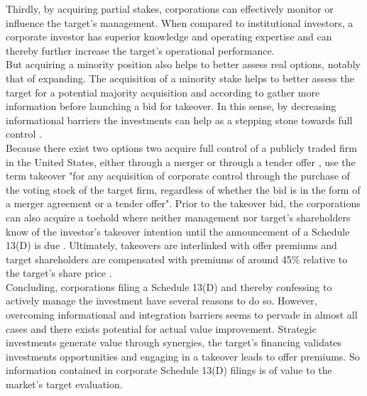 \documentclass[12pt]{article}
\begin{document}
Thirdly, by acquiring partial stakes, corporations can effectively monitor or influence the target's management. When compared to institutional investors, a corporate investor has superior knowledge and operating expertise \citep[p.2792]{Allen2000} and can thereby further increase the target's operational performance.\\
But acquiring a minority position also helps to better assess real options, notably that of expanding. The acquisition of a minority stake helps to better assess the target for a potential majority acquisition \citep{Ouimet2013} and according to \citet[p.30]{Huang2017} gather more information before launching a bid for takeover. In this sense, by decreasing informational barriers the investments can help as a stepping stone towards full control \citep[p.3]{Huang2017}.\\
Because there exist two options two acquire full control of a publicly traded firm in the United States, either through a merger or through a tender offer \citep[p.2]{Offenberg2015}, \citet[p.1]{Betton2008} use the term takeover "for any acquisition of corporate control through the purchase of the voting stock of the target firm, regardless of whether the bid is in the form of a merger agreement or a tender offer".
Prior to the takeover bid, the corporations can also acquire a toehold where neither management nor target's shareholders know of the investor's takeover intention until the announcement of a Schedule 13(D) is due \citep[p.158]{Eckbo2009}. Ultimately, takeovers are interlinked with offer premiums and target shareholders are compensated with premiums of around 45\% relative to the target's share price \citep[p.154]{Eckbo2009}.\\
Concluding, corporations filing a Schedule 13(D) and thereby confessing to actively manage the investment have several reasons to do so. However, overcoming informational and integration barriers seems to pervade in almost all cases and there exists potential for actual value improvement. Strategic investments generate value through synergies, the target's financing validates investments opportunities and engaging in a takeover leads to offer premiums. So information contained in corporate Schedule 13(D) filings is of value to the market's target evaluation. 
\end{document}
